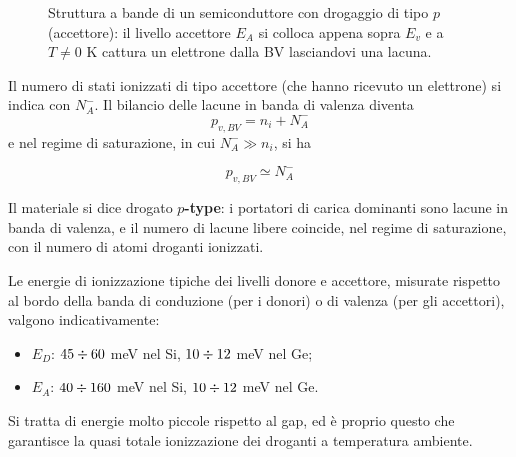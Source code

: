 \begin{figure}[htbp]
    \caption{Struttura a bande di un semiconduttore con drogaggio di tipo \( p \) (accettore): il livello accettore \( E_A \) si colloca appena sopra \( E_v \) e a \( T \neq 0 \) K cattura un elettrone dalla BV lasciandovi una lacuna.}
    \label{fig:drogaggio_p_type}
\end{figure}

Il numero di stati ionizzati di tipo accettore (che hanno ricevuto un elettrone) si indica con \( N_A^- \). Il bilancio delle lacune in banda di valenza diventa
\begin{equation}
    p_{v, BV} = n_i + N_A^-
\end{equation}
e nel regime di saturazione, in cui \( N_A^- \gg n_i \), si ha
\begin{importantbox}
    \begin{equation}
        p_{v, BV} \simeq N_A^-
    \end{equation}
\end{importantbox}
Il materiale si dice drogato \textbf{\( p \)-type}: i portatori di carica dominanti sono lacune in banda di valenza, e il numero di lacune libere coincide, nel regime di saturazione, con il numero di atomi droganti ionizzati.

Le energie di ionizzazione tipiche dei livelli donore e accettore, misurate rispetto al bordo della banda di conduzione (per i donori) o di valenza (per gli accettori), valgono indicativamente:
\begin{itemize}
    \item \( E_D \): \( 45 \divisionsymbol 60 \) meV nel Si, \( 10 \divisionsymbol 12 \) meV nel Ge;
    \item \( E_A \): \( 40 \divisionsymbol 160 \) meV nel Si, \( 10 \divisionsymbol 12 \) meV nel Ge.
\end{itemize}
Si tratta di energie molto piccole rispetto al gap, ed è proprio questo che garantisce la quasi totale ionizzazione dei droganti a temperatura ambiente.


